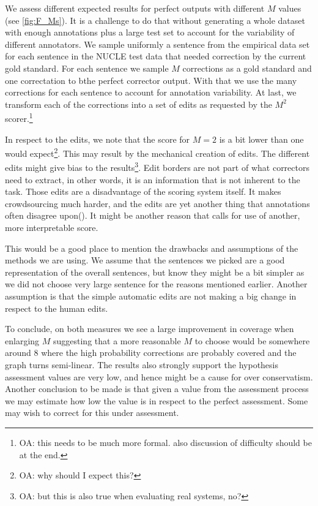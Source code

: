 \documentclass[letter,11pt]{article}
\newcommand{\oa}[1]{\footnote{\color{red}OA: #1}}
\begin{document}
 We assess different expected results for perfect outputs with different
 $M$ values (see \ref{fig:F_Ms}).
 It is a challenge to do that without generating a whole dataset with enough annotations plus a large test
 set to account for the variability of different annotators. We sample uniformly a sentence from the
 empirical data set for each sentence in the NUCLE test data that needed correction by the current gold standard.
 For each sentence we sample $M$ corrections as a gold standard and one correctation to bthe perfect corrector
 output. With that we use the many corrections for each sentence to account for annotation variability.
 At last, we transform each of the corrections into a set of edits as requested
 by the $M^2$ scorer.\oa{this needs to be much more formal. also discussion of difficulty should be at the end.}

 
In respect to the edits, we note that the score for $M=2$ is a bit lower than one would expect\oa{why should I expect this?}. This may result by the mechanical creation of edits. The different edits might give bias to the results\oa{but this is also true when evaluating real systems, no?}. Edit borders are not part of what correctors need to extract, in other words, it is an information that is not inherent to the task. Those edits are a disadvantage of the scoring system itself. It makes crowdsourcing much harder, and the edits are yet another thing that annotations often disagree upon(\cite{dahlmeier2012better}). It might be another reason that calls for use of another, more interpretable score.

This would be a good place to mention the drawbacks and assumptions of the methods we are using. We assume that the sentences we picked are a good representation of the overall sentences, but know they might be a bit simpler as we did not choose very large sentence for the reasons mentioned earlier. Another assumption is that the simple automatic edits are not making a big change in respect to the human edits.

To conclude, on both measures we see a large improvement in coverage when enlarging $M$ suggesting that a more reasonable $M$ to choose would be somewhere around 8 where the high probability corrections are probably covered and the graph turns semi-linear. The results also strongly support the hypothesis assessment values are very low, and hence might be a cause for over conservatism.
 Another conclusion to be made is that given a value from the assessment process we may estimate how low the value is in respect to the perfect assessment. Some may wish to correct for this under assessment.
 
\end{document}
